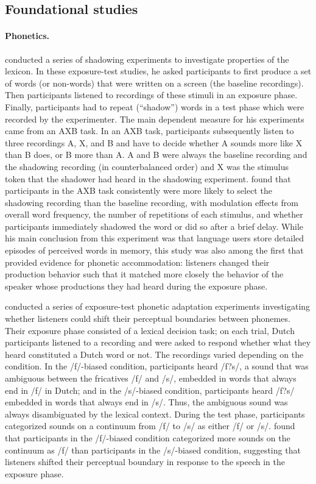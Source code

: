 \subsection{Foundational studies}

\paragraph{Phonetics.} \cite{Goldinger1998} conducted a series of shadowing experiments to investigate properties of the lexicon. In these exposure-test studies, 
he asked participants to first produce a set of words (or non-words) that were written on a screen (the baseline recordings). Then participants listened to recordings of these stimuli in 
an exposure phase. Finally, participants had to repeat (``shadow'') words in a test phase which were recorded by the experimenter. The main dependent measure
for his experiments came from an AXB task. In an AXB task, participants subsequently listen to three recordings A, X, and B and have to decide whether A sounds more like X
than B does, or B more than A. A and B were always the baseline recording and the shadowing recording (in counterbalanced order) and X was the stimulus token that the shadower had heard
in the shadowing experiment. \cite{Goldinger1998} found that participants in the AXB task consistently were more likely to select the shadowing recording than the baseline recording, with modulation
effects from overall word frequency, the number of repetitions of each stimulus, and whether participants immediately shadowed the word or did so after a brief delay. While his main conclusion
from this experiment was that language users store detailed episodes of perceived words in memory, this study was also among the first that provided evidence for phonetic accommodation: 
listeners changed their production behavior such that it matched more closely the behavior of the speaker whose productions they had heard during the exposure phase.

\cite{Norris2003} conducted a series of exposure-test phonetic adaptation
experiments investigating whether listeners could shift their perceptual boundaries between phonemes. Their exposure phase
consisted of a lexical decision task; on each trial, Dutch participants listened to a recording and were asked to respond whether
what they heard constituted a Dutch word or not. The recordings varied depending on the condition. In the /f/-biased condition,
participants heard /f?s/, a sound that was ambiguous between the fricatives /f/ and /s/, embedded in words that always end in /f/
in Dutch; and in the /s/-biased condition, participants heard /f?s/ embedded in words that always end in /s/. Thus, the ambiguous sound was always 
disambiguated by the lexical context. During the test phase, participants categorized sounds on a continuum from /f/ to /s/ as either /f/ or /s/. \cite{Norris2003}
found that participants in the /f/-biased condition categorized more sounds on the continuum as /f/ than participants in the /s/-biased condition,
suggesting that listeners shifted their perceptual boundary in response to the speech in the exposure phase.
 
